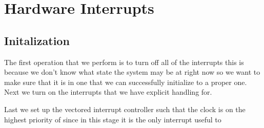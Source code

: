 \documentclass[pdftex,10pt,a4paper]{article}
\begin{document}
\newpage
\section*{Hardware Interrupts}

\subsection*{Initalization}

The first operation that we perform is to turn off all of the interrupts 
this is because we don't know what state the system may be at right now so we
want to make sure that it is in one that we can successfully initialize to a
proper one. Next we turn on the interrupts that we have explicit handling for.

Last we set up the vectored interrupt controller such that the clock is on the
highest priority of  since in this stage it is the only interrupt useful to
\end{document}
